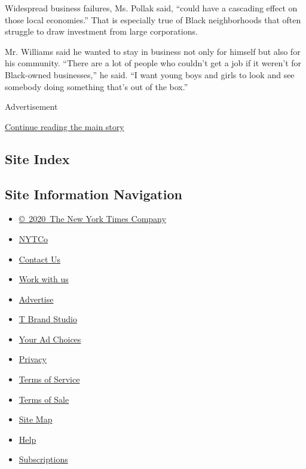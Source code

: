 Widespread business failures, Ms. Pollak said, ``could have a cascading
effect on those local economies.'' That is especially true of Black
neighborhoods that often struggle to draw investment from large
corporations.

Mr. Williams said he wanted to stay in business not only for himself but
also for his community. ``There are a lot of people who couldn't get a
job if it weren't for Black-owned businesses,'' he said. ``I want young
boys and girls to look and see somebody doing something that's out of
the box.''

Advertisement

\protect\hyperlink{after-bottom}{Continue reading the main story}

\hypertarget{site-index}{%
\subsection{Site Index}\label{site-index}}

\hypertarget{site-information-navigation}{%
\subsection{Site Information
Navigation}\label{site-information-navigation}}

\begin{itemize}
\tightlist
\item
  \href{https://help.nytimes3xbfgragh.onion/hc/en-us/articles/115014792127-Copyright-notice}{©~2020~The
  New York Times Company}
\end{itemize}

\begin{itemize}
\tightlist
\item
  \href{https://www.nytco.com/}{NYTCo}
\item
  \href{https://help.nytimes3xbfgragh.onion/hc/en-us/articles/115015385887-Contact-Us}{Contact
  Us}
\item
  \href{https://www.nytco.com/careers/}{Work with us}
\item
  \href{https://nytmediakit.com/}{Advertise}
\item
  \href{http://www.tbrandstudio.com/}{T Brand Studio}
\item
  \href{https://www.nytimes3xbfgragh.onion/privacy/cookie-policy\#how-do-i-manage-trackers}{Your
  Ad Choices}
\item
  \href{https://www.nytimes3xbfgragh.onion/privacy}{Privacy}
\item
  \href{https://help.nytimes3xbfgragh.onion/hc/en-us/articles/115014893428-Terms-of-service}{Terms
  of Service}
\item
  \href{https://help.nytimes3xbfgragh.onion/hc/en-us/articles/115014893968-Terms-of-sale}{Terms
  of Sale}
\item
  \href{https://spiderbites.nytimes3xbfgragh.onion}{Site Map}
\item
  \href{https://help.nytimes3xbfgragh.onion/hc/en-us}{Help}
\item
  \href{https://www.nytimes3xbfgragh.onion/subscription?campaignId=37WXW}{Subscriptions}
\end{itemize}
